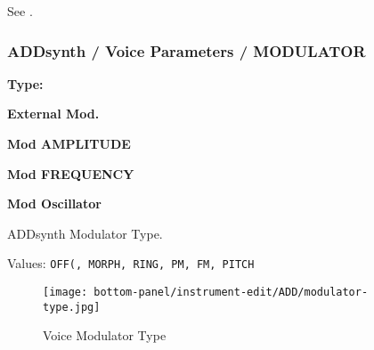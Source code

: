    See .

\subsubsection{ADDsynth / Voice Parameters / MODULATOR}
\label{subsubsec:addsynth_voice_parameters_modulator}

   \begin{enumber}
      \item \textbf{Type:}
      \item \textbf{External Mod.}
      \item \textbf{Mod AMPLITUDE}
      \item \textbf{Mod FREQUENCY}
      \item \textbf{Mod Oscillator}
   \end{enumber}

   \setcounter{ItemCounter}{0}      %

   ADDsynth Modulator Type.

   Values: \texttt{OFF(, MORPH, RING, PM, FM, PITCH}

\begin{figure}[H]
   \centering 
   \texttt{[image: bottom-panel/instrument-edit/ADD/modulator-type.jpg]}
   \caption{Voice Modulator Type}
   \label{fig:voice_modulator_type}
\end{figure}

